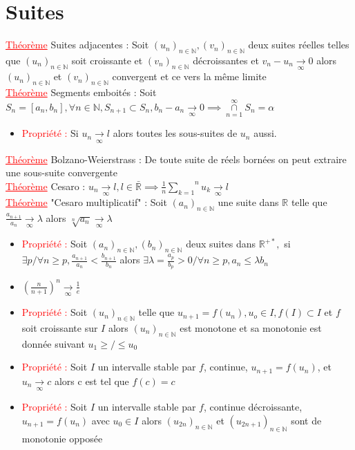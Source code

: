 \documentclass[a4paper, french]{article}
\newcommand{\R}{\mathbb{R}}
\newcommand{\N}{\mathbb{N}}
\newcommand{\al}{\alpha}
\newcommand{\la}{\lambda}
\newcommand{\som}[2]{\overset{#2}{\underset{#1}{\sum}}}
\newcommand{\thm}{\textcolor{red}{\underline{Théorème} }}
\newcommand{\ppt}{\textcolor{red}{Propriété : }}
\newcommand{\limit}[1]{\underset{#1}{\rightarrow}}
\newcommand{\inv}[1]{\frac{1}{#1}}
\begin{document}
	\section{Suites}
	 \thm Suites adjacentes : Soit $(u_n)_{n \in \N}, (v_n)_{n \in \N}$ deux suites réelles telles que $(u_n)_{n \in \N}$ soit croissante et $(v_n)_{n \in \N}$ décroissantes et $v_n-u_n\limit{\infty}0$ alors $(u_n)_{n \in \N}$ et $(v_n)_{n \in \N}$ convergent et ce vers la même limite\\
	 \thm Segments emboités : Soit $S_n=[a_n,b_n], \forall n \in \N, S_{n+1} \subset S_n, b_n-a_n \limit{\infty}0 \implies \overset{\infty}{\underset{n=1}{\cap}} S_n={\al}$
	\begin{itemize}
	  \item \ppt Si $u_n \limit{\infty}l$ alors toutes les sous-suites de $u_n$ aussi.
	\end{itemize}
	 \thm Bolzano-Weierstrass : De toute suite de réels bornées on peut extraire une sous-suite convergente \\
	 \thm Cesaro : $u_n \limit{\infty}l, l \in \bar{\R} \implies \inv{n}\som{k=1}{n}u_k \limit{\infty}l$ \\
	 \thm "Cesaro multiplicatif" : Soit $(a_n)_{n \in \N}$ une suite dans $\R$ telle que $\frac{a_{n+1}}{a_n}\limit{\infty}\la$ alors $\sqrt[n]{a_n}\limit{\infty}\la$

	\begin{itemize}
	  \item \ppt Soit $(a_n)_{n \in \N},(b_n)_{n \in \N}$ deux suites dans $\R^{+*},$ si $\exists p / \forall n \geqslant p, \frac{a_{n+1}}{a_n} < \frac{b_{n+1}}{b_n}$ alors $\exists \la = \frac{a_p}{b_p}>0/ \forall n \geqslant p, a_n \leqslant \la b_n$
	  \item $(\frac{n}{n+1})^n\limit{\infty}\inv{e}$
	  \item \ppt Soit $(u_n)_{n \in \N}$ telle que $u_{n+1}=f(u_n), u_o \in I, f(I) \subset I$ et $f$ soit croissante sur $I$ alors $(u_n)_{n \in \N}$ est monotone et sa monotonie est donnée suivant $u_1 \geqslant/\leqslant u_0$
	  \item \ppt Soit $I$ un intervalle stable par $f$, continue, $u_{n+1}=f(u_n)$, et $u_n\limit{\infty}c$ alors c est tel que $f(c)=c$
	  \item \ppt Soit $I$ un intervalle stable par $f$, continue décroissante, $u_{n+1}=f(u_n)$ avec $u_0 \in I$ alors $(u_{2n})_{n \in \N}$ et $(u_{2n+1})_{n \in \N}$ sont de monotonie opposée
	\end{itemize}
\end{document}
